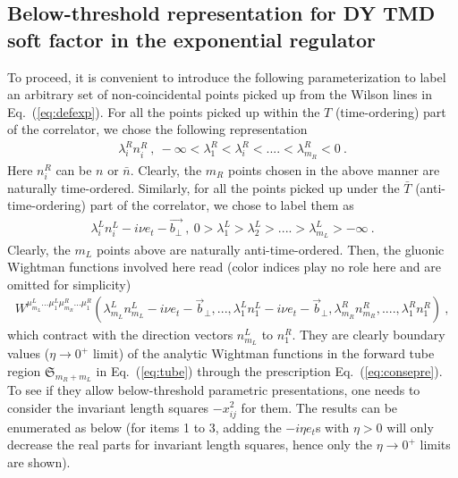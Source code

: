 \documentclass[a4paper,11pt]{article}
\begin{document}
\subsection{Below-threshold representation for DY TMD soft factor in the exponential regulator}
To proceed, it is convenient to introduce the following parameterization to label an arbitrary set of non-coincidental points picked up from the Wilson lines in Eq.~(\ref{eq:defexp}). For all the points picked up within the $T$ (time-ordering) part of the correlator, we chose the following representation
\begin{align}
\lambda^R_i n^R_i \ , \  -\infty<\lambda^R_1<\lambda^R_i<....<\lambda^R_{m_R}<0 \ .
\end{align}
Here $n^R_i$ can be $n$ or $\bar n$. Clearly, the $m_R$ points chosen in the above manner are naturally time-ordered. Similarly, for all the points picked up under the $\bar T$ (anti-time-ordering) part of the correlator, we chose to label them as
\begin{align} \label{eq:parameters}
\lambda^L_i n^L_i-i\nu e_t-\vec{b_\perp} \ , \   0>\lambda^L_1>\lambda^L_2>....>\lambda^L_{m_L}>-\infty \ .
\end{align}
Clearly, the $m_L$ points above are naturally anti-time-ordered. Then, the gluonic Wightman functions involved here read (color indices play no role here and are omitted for simplicity)
\begin{align}\label{eq:gluonwight}
W^{\mu^L_{m_L}...\mu^L_{1} \mu^{R}_{m_R}...\mu^R_1}(\lambda^L_{m_L}n^L_{m_L}-i\nu e_t-\vec{b}_\perp,...,\lambda^{L}_1n^L_1-i\nu e_t-\vec{b}_\perp,\lambda^R_{m_R}n^R_{m_R},....,\lambda^R_1 n^R_1) \ ,
\end{align}
which contract with the direction vectors $n^L_{m_L}$ to $n_1^R$.  They are clearly boundary values ($\eta \rightarrow 0^+$ limit) of the analytic Wightman functions in the forward tube region $\mathfrak{S}_{m_R+m_L}$ in Eq.~(\ref{eq:tube}) through the prescription Eq.~(\ref{eq:consepre}). To see if they allow below-threshold parametric presentations, one needs to consider the invariant length squares $-x_{ij}^2$ for them. The results can be enumerated as below (for items 1 to 3, adding the $-i\eta e_t$s with $\eta>0$ will only decrease the real parts for invariant length squares, hence only the $\eta \rightarrow 0^+$ limits are shown).
\end{document}
